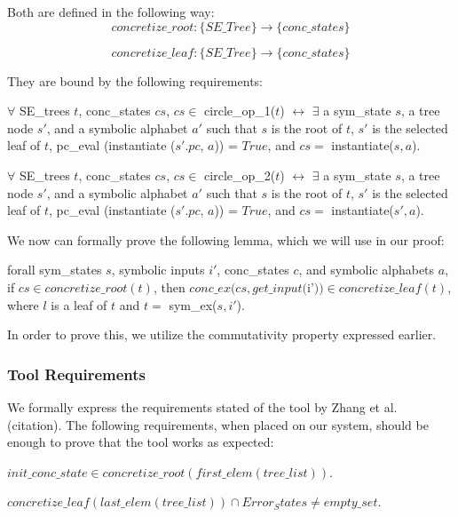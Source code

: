 Both are defined in the following way: 
$$concretize\_root : \{ SE\_Tree \} \rightarrow \{conc\_states\}$$

$$concretize\_leaf : \{ SE\_Tree \} \rightarrow \{conc\_states\}$$

They are bound by the following requirements:

\begin{axiom}
$\forall$ SE\_trees $t$,  conc\_states $cs$,
$cs \in$ circle\_op\_1($t$) $\leftrightarrow$ 
$\exists$ a sym\_state $s$, a tree node $s'$, and a symbolic alphabet $a'$ such that
$s$ is the root of $t$, $s'$ is the selected leaf of $t$, 
pc\_eval (instantiate ($s'.pc$, $a$)) = $True$, and 
$cs =$ instantiate($s, a$).
\end{axiom}

\begin{axiom}
$\forall$ SE\_trees $t$,  conc\_states $cs$,
$cs \in$ circle\_op\_2($t$) $\leftrightarrow$ 
$\exists$ a sym\_state $s$, a tree node $s'$, and a symbolic alphabet $a'$ such that
$s$ is the root of $t$, $s'$ is the selected leaf of $t$, 
pc\_eval (instantiate ($s'.pc$, $a$)) = $True$, and 
$cs =$ instantiate($s', a$).
\end{axiom}


We now can formally prove the following lemma, which we will use in our proof:
\begin{lemma} \label{cop}
forall sym\_states $s$, symbolic inputs $i'$, conc\_states $c$, and symbolic alphabets $a$,
if $cs \in concretize\_root(t)$,
then 
$conc\_ex(cs, get\_input ($i'$)) \in concretize\_leaf(t)$,
where $l$ is a leaf of $t$ and $t = $ sym\_ex($s, i'$).
\end{lemma}

In order to prove this, we utilize the commutativity property expressed earlier.


\subsubsection{Tool Requirements}
We formally express the requirements stated of the tool by Zhang et al. (citation).
The following requirements, when placed on our system, should be enough to prove that the tool works as expected:
\begin{axiom}[Property $1$]
$init\_conc\_state \in concretize\_root(first\_elem (tree\_list))$.
\end{axiom}

\begin{axiom}[Property $2$]
$ concretize\_leaf (last\_elem (tree\_list)) \cap Error_States 
\neq empty\_set $.
\end{axiom}

